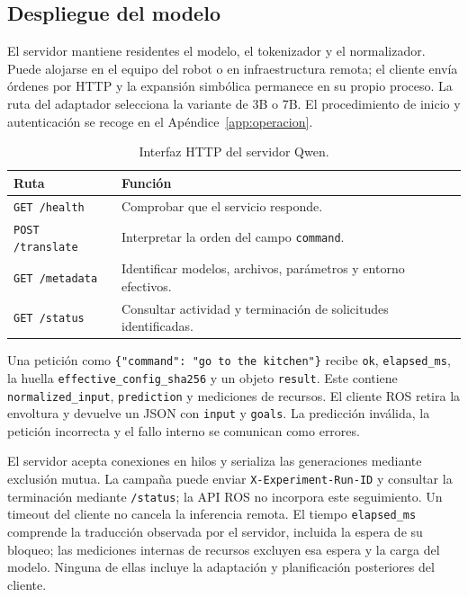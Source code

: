 \subsection{Despliegue del modelo}
\label{subsec:despliegue_qwen}

El servidor mantiene residentes el modelo, el tokenizador y el normalizador. Puede alojarse en el equipo del robot o en infraestructura remota; el cliente envía órdenes por HTTP y la expansión simbólica permanece en su propio proceso. La ruta del adaptador selecciona la variante de 3B o 7B. El procedimiento de inicio y autenticación se recoge en el Apéndice~\ref{app:operacion}.

\begin{table}[htbp]
\centering
\small
\caption{Interfaz HTTP del servidor Qwen.}
\label{tab:interfaz_http_qwen_impl}
\begin{tabularx}{\textwidth}{@{}lX@{}}
\toprule
\textbf{Ruta} & \textbf{Función} \\
\midrule
\texttt{GET /health} & Comprobar que el servicio responde. \\
\texttt{POST /\allowbreak translate} & Interpretar la orden del campo \texttt{command}. \\
\texttt{GET /metadata} & Identificar modelos, archivos, parámetros y entorno efectivos. \\
\texttt{GET /status} & Consultar actividad y terminación de solicitudes identificadas. \\
\bottomrule
\end{tabularx}
\end{table}

Una petición como \texttt{\{"command": "go to the kitchen"\}} recibe
\texttt{ok}, \texttt{elapsed\_ms}, la huella
\texttt{effective\_\allowbreak config\_\allowbreak sha256} y un objeto \texttt{result}.
Este contiene \texttt{normalized\_\allowbreak input}, \texttt{prediction} y
mediciones de recursos. El cliente ROS retira la envoltura y devuelve
un JSON con \texttt{input} y \texttt{goals}. La predicción inválida,
la petición incorrecta y el fallo interno se comunican como errores.

El servidor acepta conexiones en hilos y serializa las generaciones
mediante exclusión mutua. La campaña puede enviar
\texttt{X-\allowbreak Experiment-\allowbreak Run-\allowbreak ID} y consultar la terminación mediante
\texttt{/status}; la API ROS no incorpora este seguimiento.
Un timeout del cliente no cancela la inferencia remota.
El tiempo \texttt{elapsed\_ms} comprende la traducción observada por
el servidor, incluida la espera de su bloqueo; las mediciones internas
de recursos excluyen esa espera y la carga del modelo. Ninguna de ellas
incluye la adaptación y planificación posteriores del cliente.

